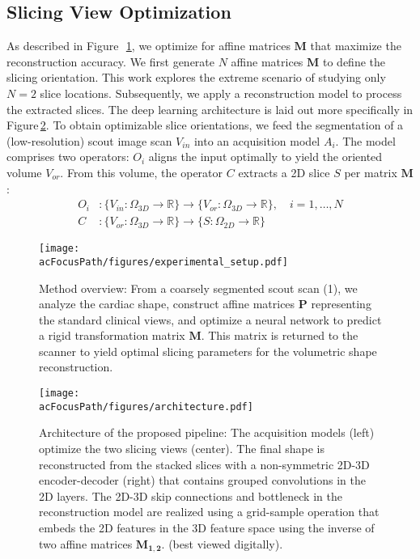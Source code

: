     \subsection{Slicing View Optimization}
    As described in Figure~\,\ref{fig:method_overview}, we optimize for affine matrices $\mathbf{M}$ that maximize the reconstruction accuracy.
    We first generate $N$ affine matrices $\mathbf{M}$ to define the slicing orientation. This work explores the extreme scenario of studying only $N=2$ slice locations. Subsequently, we apply a reconstruction model to process the extracted slices.
    The deep learning architecture is laid out more specifically in Figure\,\ref{fig:architecture}.
    To obtain optimizable slice orientations, we feed the segmentation of a (low-resolution) scout image scan $V_{in}$ into an acquisition model $A_i$. The model comprises two operators: $O_i$ aligns the input optimally to yield the oriented volume $V_{or}$.  From this volume, the operator $C$ extracts a 2D slice $S$ per matrix $\mathbf{M}$:
    \begin{align}
        O_i&: \{ V_{in}:\Omega_{3D} \rightarrow \mathbb{R}\} \rightarrow \{ V_{or}: \Omega_{3D} \rightarrow \mathbb{R}\}, \quad i = 1,\dots,N \label{eq:orientation} \\
        C&: \{ V_{or}:\Omega_{3D} \rightarrow \mathbb{R}\} \rightarrow \{ S: \Omega_{2D} \rightarrow \mathbb{R}\} \label{eq:slicing}
    \end{align}

    \begin{figure}
        \texttt{[image: \\acFocusPath/figures/experimental\_setup.pdf]}
        \caption{
        Method overview: From a coarsely segmented scout scan (1), we analyze the cardiac shape, construct affine matrices $\mathbf{P}$ representing the standard clinical views, and optimize a neural network to predict a rigid transformation matrix $\mathbf{M}$. This matrix is returned to the scanner to yield optimal slicing parameters for the volumetric shape reconstruction. }
        \label{fig:method_overview}
    \end{figure}

    \begin{figure}
        \texttt{[image: \\acFocusPath/figures/architecture.pdf]}
        \caption{Architecture of the proposed pipeline: The acquisition models (left) optimize the two slicing views (center). The final shape is reconstructed from the stacked slices with a non-symmetric 2D-3D encoder-decoder (right) that contains grouped convolutions in the 2D layers. The 2D-3D skip connections and bottleneck in the reconstruction model are realized using a grid-sample operation that embeds the 2D features in the 3D feature space using the inverse of two affine matrices $\mathbf{M_{1,2}}$. (best viewed digitally).}
    \label{fig:architecture}
    \end{figure}

